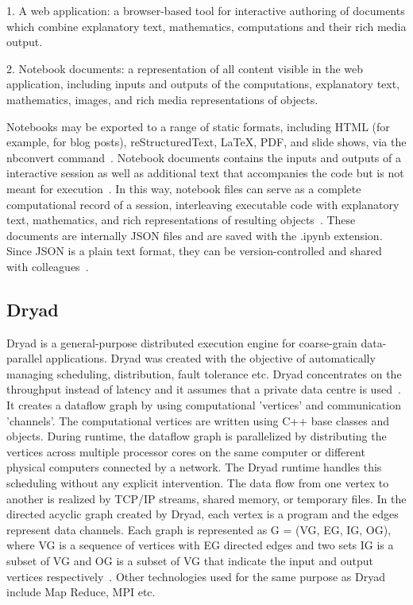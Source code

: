     1. A web application: a browser-based tool for interactive
    authoring of documents which combine explanatory text,
    mathematics, computations and their rich media output.

    2. Notebook documents: a representation of all content visible in
    the web application, including inputs and outputs of the
    computations, explanatory text, mathematics, images, and rich
    media representations of objects.

    Notebooks may be exported to a range of static formats, including
    HTML (for example, for blog posts), reStructuredText, LaTeX, PDF,
    and slide shows, via the nbconvert command~\cite{www-jupyter-3}.
    Notebook documents contains the inputs and outputs of a
    interactive session as well as additional text that accompanies
    the code but is not meant for execution~\cite{www-jupyter-4}. In
    this way, notebook files can serve as a complete computational
    record of a session, interleaving executable code with explanatory
    text, mathematics, and rich representations of resulting
    objects~\cite{www-jupyter-5}. These documents are internally JSON
    files and are saved with the .ipynb extension. Since JSON is a
    plain text format, they can be version-controlled and shared with
    colleagues~\cite{www-jupyter-6}.

\subsection{Dryad \vc}

Dryad is a general-purpose distributed execution engine for
coarse-grain data-parallel applications. Dryad was created with the
objective of automatically managing scheduling, distribution, fault
tolerance etc. Dryad concentrates on the throughput instead of latency
and it assumes that a private data centre is
used~\cite{www-DryadIntro}.  It creates a dataflow graph by using
computational 'vertices' and communication 'channels'. The
computational vertices are written using C++ base classes and
objects. During runtime, the dataflow graph is parallelized by
distributing the vertices across multiple processor cores on the same
computer or different physical computers connected by a network. The
Dryad runtime handles this scheduling without any explicit
intervention. The data flow from one vertex to another is realized by
TCP/IP streams, shared memory, or temporary files. In the directed
acyclic graph created by Dryad, each vertex is a program and the edges
represent data channels. Each graph is represented as G = (VG, EG, IG,
OG), where VG is a sequence of vertices with EG directed edges and two
sets IG is a subset of VG and OG is a subset of VG that indicate the
input and output vertices respectively~\cite{DryadPaper}. Other
technologies used for the same purpose as Dryad include Map Reduce,
MPI etc.

